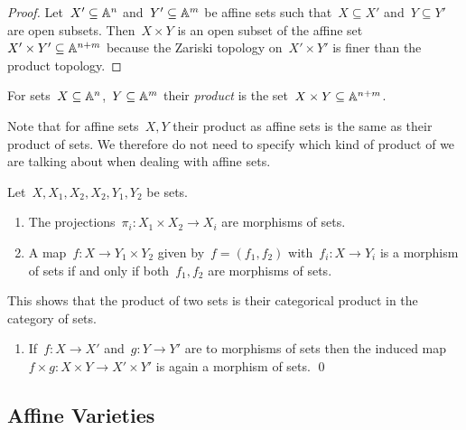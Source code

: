 \begin{proof}
  Let~$X' \subseteq \mathbb{A}^n$ and~$Y' \subseteq \mathbb{A}^m$ be affine sets such that~$X \subseteq X'$ and~$Y \subseteq Y'$ are open subsets.
  Then~$X \times Y$ is an open subset of the affine set~$X' \times Y' \subseteq \mathbb{A}^{n+m}$ because the Zariski topology on~$X' \times Y'$ is finer than the product topology.
\end{proof}



\begin{definition}
  For {\qaffine} sets~$X \subseteq \mathbb{A}^n$,~$Y \subseteq \mathbb{A}^m$ their \emph{product} is the {\qaffine} set~$X \times Y \subseteq \mathbb{A}^{n+m}$.
\end{definition}


\begin{fluff}
  Note that for affine sets~$X, Y$ their product as affine sets is the same as their product of {\qaffine} sets.
  We therefore do not need to specify which kind of product of we are talking about when dealing with affine sets.
\end{fluff}


\begin{lemma}
  Let~$X, X_1, X_2, X_2, Y_1, Y_2$ be {\qaffine} sets.
  \begin{enumerate}
    \item
      The projections~$\pi_i \colon X_1 \times X_2 \to X_i$ are morphisms of {\qaffine} sets.
    \item
      A map~$f \colon X \to Y_1 \times Y_2$ given by~$f = (f_1, f_2)$ with~$f_i \colon X \to Y_i$ is a morphism of {\qaffine} sets if and only if both~$f_1, f_2$ are morphisms of {\qaffine} sets.
  \end{enumerate}
  This shows that the product of two {\qaffine} sets is their categorical product in the category of {\qaffine} sets.
  \begin{enumerate}[resume]
    \item
      If~$f \colon X \to X'$ and~$g \colon Y \to Y'$ are to morphisms of {\qaffine} sets then the induced map~$f \times g \colon X \times Y \to X' \times Y'$ is again a morphism of {\qaffine} sets.
    \qed
  \end{enumerate}
\end{lemma}





\subsection{Affine Varieties}


